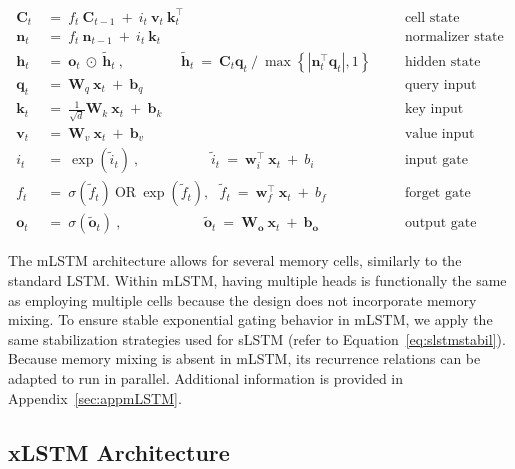 \begin{align}
\label{eq:mlstm_recurrent_begin}
\mathbf{C}_t \ &= \  f_t \ \mathbf{C}_{t-1} \ + \ 
  i_t \ \mathbf{v}_t \ \mathbf{k}_t^\top & &  &\text{cell state} \\
\mathbf{n}_t \ &= \  f_t \ \mathbf{n}_{t-1} \ + \ 
  i_t \ \mathbf{k}_t & &  &\text{normalizer state} \\
\mathbf{h}_t  \ &= \ \mathbf{o}_t \ \odot \ \tilde{\mathbf{h}}_t
\ , \qquad \qquad 
\tilde{\mathbf{h}}_t \ = \   \mathbf{C}_t \mathbf{q}_t \ / \ 
  \max \left\{ |\mathbf{n}_t^\top \mathbf{q}_t|, 1 \right\} 
   &&&\text{hidden state} \\
\mathbf{q}_t \ &= \ \mathbf{W}_q \ \mathbf{x}_t \ + \ \mathbf{b}_q  & &  &\text{query input} \\
\mathbf{k}_t \ &= \ \frac{1}{\sqrt{d}} \mathbf{W}_k \ \mathbf{x}_t \ + \ \mathbf{b}_k  & &  &\text{key input} \\
\mathbf{v}_t \ &= \ \mathbf{W}_v \ \mathbf{x}_t \ + \ \mathbf{b}_v  & &  &\text{value input} \\
i_t \ &= \ \!\exp \!  \! \left( \tilde{i}_t  \right) \ , 
 \qquad \qquad \ \ \ \ \,
  \tilde{i}_t \ = \ \mathbf{w}^\top_{i} \ \mathbf{x}_t \ + \  b_{i} \ \ \ 
  &&&\text{input gate} \\
f_t \ &= \ \sigma \!  \left(  \tilde{f}_t \right) \ \text{OR} \ \!\exp \!  \! \left(  \tilde{f}_t \right) , \ \ \: \!
\tilde{f}_t \ = \ \mathbf{w}^\top_{f} \ \mathbf{x}_t  \ + \
  b_{f}
  &&& \text{forget gate} \\
\label{eq:mlstm_recurrent_end}
\mathbf{o}_t \ &= \ \sigma \left( \tilde{\mathbf{o}}_t \right) \ , \qquad \qquad \quad \ \ \ \,
  \tilde{\mathbf{o}}_t  \ = \ \mathbf{W}_{\mathbf{o}} \ \mathbf{x}_t \ + \
  \mathbf{b}_{\mathbf{o}}
  &&&\text{output gate} 
\end{align}

The mLSTM architecture allows for several memory cells, similarly to the standard LSTM. Within mLSTM, having multiple heads is functionally the same as employing multiple cells because the design does not incorporate memory mixing. To ensure stable exponential gating behavior in mLSTM, we apply the same stabilization strategies used for sLSTM (refer to Equation~\ref{eq:slstmstabil}). Because memory mixing is absent in mLSTM, its recurrence relations can be adapted to run in parallel. Additional information is provided in Appendix~\ref{sec:appmLSTM}.

\subsection{xLSTM Architecture}
\label{sec:xLSTMarch}

